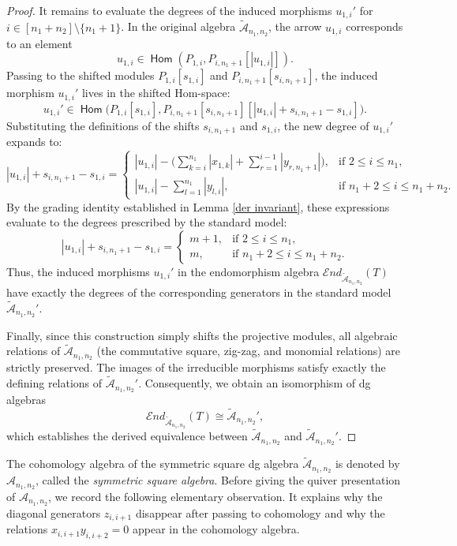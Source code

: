 \documentclass[a4paper, reqno, 11pt]{amsart}
\theoremstyle{definition}
\newcommand{\opname}[1]{\operatorname{\mathsf{#1}}}
\newcommand{\Hom}{\opname{Hom}}
\begin{document}
\begin{proof}
	It remains to evaluate the degrees of the induced morphisms $u_{1,i}'$ for $i\in[n_1+n_2]\setminus\{n_1+1\}$. In the original algebra $\widetilde{\mathcal{A}}_{n_1,n_2}$, the arrow $u_{1,i}$ corresponds to an element
	\[
	u_{1,i} \in \Hom(P_{1,i}, P_{i,n_1+1}[|u_{1,i}|]).
	\]
	Passing to the shifted modules $P_{1,i}[s_{1,i}]$ and $P_{i,n_1+1}[s_{i,n_1+1}]$, the induced morphism $u_{1,i}'$ lives in the shifted Hom-space:
	\[
	u_{1,i}' \in \Hom\bigl(P_{1,i}[s_{1,i}], P_{i,n_1+1}[s_{i,n_1+1}][|u_{1,i}| + s_{i,n_1+1} - s_{1,i}]\bigr).
	\]
	Substituting the definitions of the shifts $s_{i,n_1+1}$ and $s_{1,i}$, the new degree of $u_{1,i}'$ expands to:
	\[
	|u_{1,i}| + s_{i,n_1+1} - s_{1,i} = 
	\begin{cases}
		|u_{1,i}| - \big(\sum\limits_{k=i}^{n_1} |x_{1,k}| + \sum\limits_{r=1}^{i-1} |y_{r,n_1+1}|\big), & \text{if } 2 \leq i \leq n_1, \\[1ex]
		|u_{1,i}| - \sum\limits_{l=1}^{n_1} |y_{l,i}|, & \text{if } n_1+2 \leq i \leq n_1+n_2.
	\end{cases}
	\]
	By the grading identity established in Lemma \ref{der invariant}, these expressions evaluate to the degrees prescribed by the standard model:
	\[
	|u_{1,i}| + s_{i,n_1+1} - s_{1,i} = 
	\begin{cases}
		m+1, & \text{if } 2 \leq i \leq n_1, \\[1ex]
		m, & \text{if } n_1+2 \leq i \leq n_1+n_2.
	\end{cases}
	\]
	Thus, the induced morphisms $u_{1,i}'$ in the endomorphism algebra $\mathcal{E}nd_{\widetilde{\mathcal{A}}_{n_1,n_2}}(T)$ have exactly the degrees of the corresponding generators in the standard model \(\widetilde{\mathcal A}_{n_1,n_2}'\).
	
	Finally, since this construction simply shifts the projective modules, all algebraic relations of $\widetilde{\mathcal{A}}_{n_1,n_2}$ (the commutative square, zig-zag, and monomial relations) are strictly preserved. The images of the irreducible morphisms satisfy exactly the defining relations of $\widetilde{\mathcal{A}}_{n_1,n_2}'$. Consequently, we obtain an isomorphism of dg algebras
	\[
	\mathcal{E}nd_{\widetilde{\mathcal{A}}_{n_1,n_2}}(T) \cong \widetilde{\mathcal{A}}_{n_1,n_2}',
	\]
	which establishes the derived equivalence between $\widetilde{\mathcal{A}}_{n_1,n_2}$ and $\widetilde{\mathcal{A}}_{n_1,n_2}'$.
\end{proof}





The cohomology algebra of the symmetric square dg algebra $\widetilde{\mathcal{A}}_{n_1,n_2}$ is denoted by $\mathcal{A}_{n_1,n_2}$, called the \textit{symmetric square algebra}. Before giving the quiver presentation of \(\mathcal{A}_{n_1,n_2}\), we record
the following elementary observation.  It explains why the diagonal generators
\(z_{i,i+1}\) disappear after passing to cohomology and why the relations
\(x_{i,i+1}y_{i,i+2}=0\) appear in the cohomology algebra.
\end{document}
